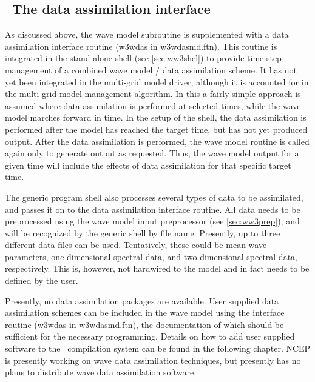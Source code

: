 \vssub
\subsection{~The data assimilation interface} \label{sec:das}
\vssub

As discussed above, the wave model subroutine is supplemented with a data
assimilation interface routine ({\F w3wdas} in {\file w3wdasmd.ftn}). This
routine is integrated in the stand-alone shell (see \para\ref{sec:ww3shel}) to
provide time step management of a combined wave model / data assimilation
scheme. It has not yet been integrated in the multi-grid model driver,
although it is accounted for in the multi-grid model management
algorithm. In this a fairly simple approach is assumed where data assimilation
is performed at selected times, while the wave model marches forward in
time. In the setup of the shell, the data assimilation is performed after the
model has reached the target time, but has not yet produced output. After the
data assimilation is performed, the wave model routine is called again only to
generate output as requested. Thus, the wave model output for a given time
will include the effects of data assimilation for that specific target time.

The generic program shell also processes several types of data to be
assimilated, and passes it on to the data assimilation interface routine. All
data needs to be preprocessed using the wave model input preprocessor (see
\para\ref{sec:ww3prep}), and will be recognized by the generic shell by file
name. Presently, up to three different data files can be used. Tentatively,
these could be mean wave parameters, one dimensional spectral data, and two
dimensional spectral data, respectively. This is, however, not hardwired to
the model and in fact needs to be defined by the user.

Presently, no data assimilation packages are available. User supplied data
assimilation schemes can be included in the wave model using the interface
routine ({\F w3wdas} in {\file w3wdasmd.ftn}), the documentation of which
should be sufficient for the necessary programming. Details on how to add user
supplied software to the \ws\ compilation system can be found in the following
chapter. NCEP is presently working on wave data assimilation techniques, but
presently has no plans to distribute wave data assimilation software.

